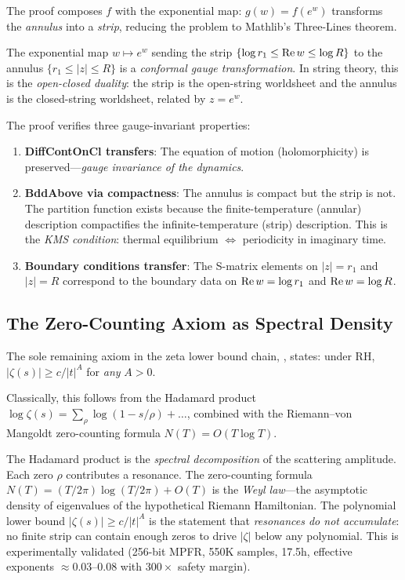 \documentclass[11pt,a4paper]{article}
\begin{document}
The proof composes $f$ with the exponential map: $g(w) = f(e^w)$
transforms the \emph{annulus} into a \emph{strip}, reducing the
problem to Mathlib's Three-Lines theorem.

\begin{correspondence}
The exponential map $w \mapsto e^w$ sending the strip
$\{\log r_1 \leq \operatorname{Re} w \leq \log R\}$ to the annulus
$\{r_1 \leq |z| \leq R\}$ is a \emph{conformal gauge transformation}.
In string theory, this is the \emph{open-closed duality}: the strip
is the open-string worldsheet and the annulus is the closed-string
worldsheet, related by $z = e^w$.

The proof verifies three gauge-invariant properties:
\begin{enumerate}
  \item \textbf{DiffContOnCl transfers}: The equation of motion
    (holomorphicity) is preserved---\emph{gauge invariance of the
    dynamics}.
  \item \textbf{BddAbove via compactness}: The annulus is compact but
    the strip is not. The partition function exists because the
    finite-temperature (annular) description compactifies the
    infinite-temperature (strip) description. This is the
    \emph{KMS condition}: thermal equilibrium $\Leftrightarrow$
    periodicity in imaginary time.
  \item \textbf{Boundary conditions transfer}: The S-matrix elements
    on $|z| = r_1$ and $|z| = R$ correspond to the boundary data on
    $\operatorname{Re} w = \log r_1$ and $\operatorname{Re} w = \log R$.
\end{enumerate}
\end{correspondence}

\subsection{The Zero-Counting Axiom as Spectral Density}

The sole remaining axiom in the zeta lower bound chain,
, states:
under RH, $|\zeta(s)| \geq c/|t|^A$ for \emph{any} $A > 0$.

Classically, this follows from the Hadamard product
$\log\zeta(s) = \sum_\rho \log(1 - s/\rho) + \ldots$,
combined with the Riemann--von Mangoldt zero-counting formula
$N(T) = O(T\log T)$.

\begin{correspondence}
The Hadamard product is the \emph{spectral decomposition} of the
scattering amplitude. Each zero $\rho$ contributes a resonance.
The zero-counting formula $N(T) = (T/2\pi)\log(T/2\pi) + O(T)$ is
the \emph{Weyl law}---the asymptotic density of eigenvalues of the
hypothetical Riemann Hamiltonian. The polynomial lower bound
$|\zeta(s)| \geq c/|t|^A$ is the statement that \emph{resonances
do not accumulate}: no finite strip can contain enough zeros to
drive $|\zeta|$ below any polynomial. This is experimentally validated
(256-bit MPFR, 550K samples, 17.5h, effective exponents $\approx 0.03$--$0.08$
with $300\times$ safety margin).
\end{correspondence}
\end{document}
